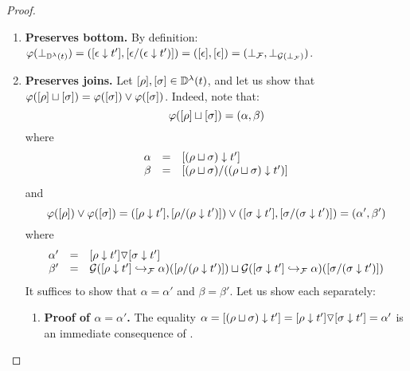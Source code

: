 \begin{proof}
\begin{enumerate}
\begin{enumerate}
\begin{enumerate}
\begin{enumerate}
      \end{enumerate}
    \item {\bf Preserves bottom.}
      By definition:
      $\varphi(\bot_{\mathbb{D}^{\lambda}(t)})
       = ({[\epsilon \downarrow t']}, {[\epsilon/(\epsilon \downarrow t')]})
       = ({[\epsilon]},{[\epsilon]})
       = (\bot_{\mathcal{F}},\bot_{\mathcal{G}(\bot_{\mathcal{F}})})$.
    \item {\bf Preserves joins.}
      Let ${[\rho]},{[\sigma]} \in \mathbb{D}^{\lambda}(t)$, and let us show that
      $\varphi({[\rho]} \sqcup {[\sigma]}) = \varphi({[\sigma]}) \lor \varphi({[\sigma]})$.
      Indeed, note that:
      \[
        \varphi({[\rho]} \sqcup {[\sigma]}) = (\alpha,\beta)
      \]
      where
      \[
        \begin{array}{rcl}
        \alpha & = & {[(\rho \sqcup \sigma) \downarrow t']} \\
        \beta  & = & {[(\rho \sqcup \sigma) / ((\rho \sqcup \sigma) \downarrow t')]} \\
        \end{array}
      \]
      and
      \[
        \varphi({[\rho]}) \lor \varphi({[\sigma]})
        = ({[\rho \downarrow t']}, {[\rho / (\rho \downarrow t')]}) \lor
          ({[\sigma \downarrow t']}, {[\sigma / (\sigma \downarrow t')]}) \\
        = (\alpha', \beta') \\
      \]
      where
      \[
        \begin{array}{rcl}
        \alpha' & = & {[\rho \downarrow t']} \triangledown {[\sigma\downarrow t']} \\
        \beta'  & = &
               \mathcal{G}({[\rho \downarrow t']} \hookrightarrow_{\mathcal{F}} \alpha)({[\rho / (\rho \downarrow t')]}) \sqcup \mathcal{G}({[\sigma \downarrow t']} \hookrightarrow_{\mathcal{F}} \alpha)({[\sigma / (\sigma \downarrow t')]})
        \end{array}
      \]
      It suffices to show that $\alpha = \alpha'$ and $\beta = \beta'$.
      Let us show each separately:
      \begin{enumerate}
      \item {\bf Proof of $\alpha = \alpha'$.}
        The equality
        $
          \alpha
          = {[(\rho \sqcup \sigma) \downarrow t']}
          = {[\rho \downarrow t']} \triangledown {[\sigma\downarrow t']}
          = \alpha'
        $
        is an immediate consequence of .

\end{enumerate}
\end{enumerate}
\end{enumerate}
\end{enumerate}
\end{proof}
